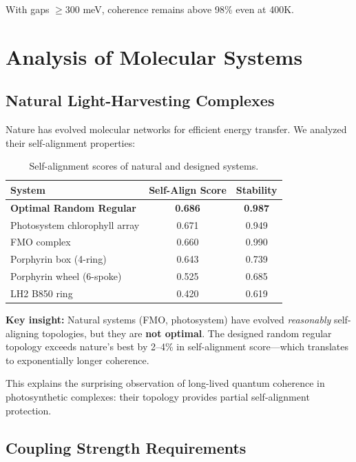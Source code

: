 \documentclass[11pt,a4paper]{article}
\theoremstyle{plain}
\theoremstyle{definition}
\theoremstyle{remark}
\begin{document}
With gaps $\geq 300$ meV, coherence remains above 98\% even at 400K.

\section{Analysis of Molecular Systems}

\subsection{Natural Light-Harvesting Complexes}

Nature has evolved molecular networks for efficient energy transfer. We analyzed their self-alignment properties:

\begin{table}[H]
\centering
\begin{tabular}{@{}lcc@{}}
\toprule
\textbf{System} & \textbf{Self-Align Score} & \textbf{Stability} \\
\midrule
\textbf{Optimal Random Regular} & \textbf{0.686} & \textbf{0.987} \\
Photosystem chlorophyll array & 0.671 & 0.949 \\
FMO complex & 0.660 & 0.990 \\
Porphyrin box (4-ring) & 0.643 & 0.739 \\
Porphyrin wheel (6-spoke) & 0.525 & 0.685 \\
LH2 B850 ring & 0.420 & 0.619 \\
\bottomrule
\end{tabular}
\caption{Self-alignment scores of natural and designed systems.}
\label{tab:natural}
\end{table}

\textbf{Key insight:} Natural systems (FMO, photosystem) have evolved \emph{reasonably} self-aligning topologies, but they are \textbf{not optimal}. The designed random regular topology exceeds nature's best by 2--4\% in self-alignment score---which translates to exponentially longer coherence.

This explains the surprising observation of long-lived quantum coherence in photosynthetic complexes: their topology provides partial self-alignment protection.

\subsection{Coupling Strength Requirements}
\end{document}
